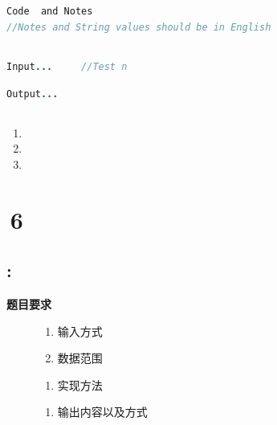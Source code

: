 \documentclass{article}
\begin{document}
\subsection{}
\begin{center}
	\begin{lstlisting}[language = Java]
Code  and Notes        
//Notes and String values should be in English
	\end{lstlisting}
\end{center}


\subsection{}
\begin{center}
	\begin{lstlisting}[language = Java]
Input...     //Test n
	\end{lstlisting}
\end{center}

\begin{center}
\begin{lstlisting}[language = Java]
Output...
\end{lstlisting}
\end{center}
\subsection{}
\begin{enumerate}
	\item\kaishu
	\item\kaishu
	\item\kaishu
\end{enumerate}
\newpage

\section{\,6}

\subsection{:}
\noindent\kaishu \textbf{题目要求}
\begin{description}
	\item [\kaishu输入]
	\begin{enumerate}
		\item \kaishu 输入方式
		\item \kaishu 数据范围
	\end{enumerate}
	\item [\kaishu实现]
	\begin{enumerate}
		\item 实现方法
		\end{enumerate}
	\item [\kaishu输出]
	\begin{enumerate}
		\item []\kaishu 输出内容以及方式
	\end{enumerate}
\end{description}
\end{document}
